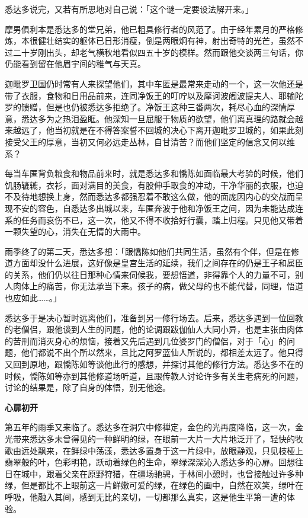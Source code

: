 \documentclass[twoside,openany]{book}
\newcommand{\mt}[1]{\textbullet \textbf{#1}}
\begin{document}
悉达多说完，又若有所思地对自己说：「这个谜一定要设法解开来。」

摩男俱利本是悉达多的堂兄弟，他已粗具修行者的风范了。由于经年累月的严格修炼，本很健壮结实的躯体已日形消瘦，倒是两眼炯有神，射出奇特的光芒，虽然不过二十岁刚出头，却老气横秋地看似四五十岁的模样。然而跟他交谈两三句话，你仍能看到留在他眉宇间的稚气与天真。

迦毗罗卫国仍时常有人来探望他们，其中车匿是最常来走动的一个，这一次他还是带了衣服，食物和日用品前来，连同净饭王的叮咛以及摩诃波阇波提夫人、耶输陀罗的馈赠，但是也仍被悉达多拒绝了。净饭王这种三番两次，耗尽心血的深情厚意，悉达多为之热泪盈眶。他深知一旦屈服于物质的欲望，他们离真理的路就会越来越远了，他当初就是在不得答案誓不回城的决心下离开迦毗罗卫城的，如果此刻接受父王的厚意，当初又何必远走丛林，自甘清苦？而他们坚定的信念又何以维系？

每当车匿背负粮食和物品前来时，就是悉达多和憍陈如面临最大考验的时候，他们饥肠辘辘，衣衫，面对满目的美食，有股伸手取食的冲动，干净华丽的衣服，也迫不及待地想换上身，然而悉达多都强忍着不敢这么做，他的面庞因内心的交战而呈现不安的容色，自悉达多出城以来，车匿奔波于他和净饭王之间，因为未能达成连系的任务而哀伤不已，这一次，他又不得不收拾好行囊，踏上归程。只见他又带着一颗失望的心，消失在无情的大雨中。

雨季终了的第二天，悉达多想：「跟憍陈如他们共同生活，虽然有个伴，但是在修道方面却没什么进展，这好像是皇宫生活的延续，我们之间存在的仍是王子和属臣的关系，他们仍以往日那种心情来伺候我，要想悟道，非得靠个人的力量不可，别人肉体上的痛苦，你无法承当下来。孩子的病，做父母的也不能代替，同理，悟道也应如此……。」

悉达多于是决心暂时远离他们，准备到另一修行场去。后来，悉达多遇到一位回教的老僧侣，跟他谈到人生的问题，他的论调跟跋伽仙人大同小异，也是主张由肉体的苦刑而消灭身心的烦恼，接着又先后遇到几位婆罗门的僧侣，对于「心」的问题，他们都说不出个所以然来，且比之阿罗蓝仙人所说的，都相差太远了。他只得又回到原地，跟憍陈如等谈他此行的感想，并探讨其他的修行方法。悉达多不在的时候，憍陈如等亦到其他修道场听道，且跟传教人讨论许多有关生老病死的问题，讨论的结果是，除了自身的体悟，别无他途。

\mt{心扉初开}

第五年的雨季又来临了。悉达多在洞穴中修禅定，金色的光再度降临，这一次，金光带来悉达多未曾得见的一种鲜明的绿，在眼前一大片一大片地泛开了，轻快的牧歌由远处飘来，在鲜绿中荡漾，悉达多置身于这一片绿中，放眼静观，只见枝桠上翡翠般的叶，色彩明艳，跃动着绿色的生命，翠绿深深沁入悉达多的心扉。回想往日在城中，跟着父亲在原野狩猎，在疆场驰骋，于林间小憩时，也曾接触过许多种绿，但是都比不上眼前这一片鲜嫩可爱的绿，在绿色的画中，自然在欢笑，绿叶在呼吸，他融入其间，感到无比的亲切，一切都那么真实，这是他生平第一遭的体验。
\end{document}

